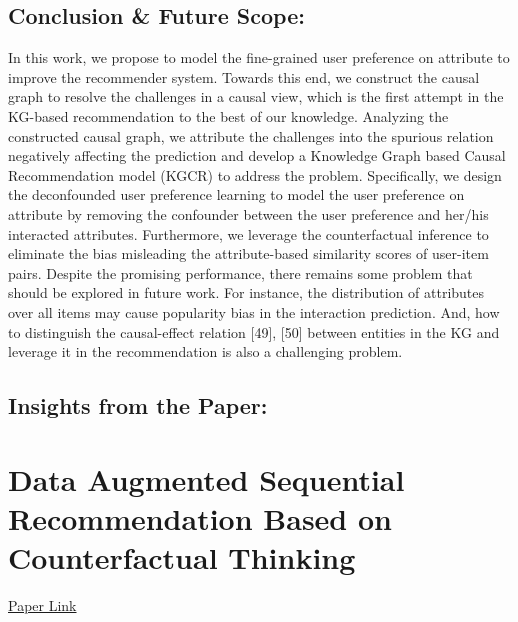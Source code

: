\documentclass[]{report}
\begin{document}
	\section*{Conclusion \& Future Scope:}
	In this work, we propose to model the fine-grained user preference on attribute to improve the recommender system. Towards this end, we construct the causal graph to resolve the challenges in a causal view, which is the first attempt in the KG-based recommendation to the best of our knowledge. Analyzing the constructed causal graph, we attribute the challenges into the spurious relation negatively affecting the prediction and develop a Knowledge Graph based Causal Recommendation model (KGCR) to address the problem. Specifically, we design the deconfounded user preference learning to model the user preference on attribute by removing the confounder between the user preference and her/his interacted attributes. Furthermore, we leverage the counterfactual inference to eliminate the bias misleading the attribute-based similarity scores of user-item pairs. Despite the promising performance, there remains some problem that should be explored in future work. For instance, the distribution of attributes over all items may cause popularity bias in the interaction prediction. And, how to distinguish the causal-effect relation [49], [50] between entities in the KG and leverage it in the recommendation is also a challenging problem.
	
	\section*{Insights from the Paper:}
	
	
	\chapter*{Data Augmented Sequential Recommendation Based on Counterfactual Thinking}
	\begin{center}
		\href{https://ieeexplore.ieee.org/document/9950302}{Paper Link}
	\end{center}
\end{document}
